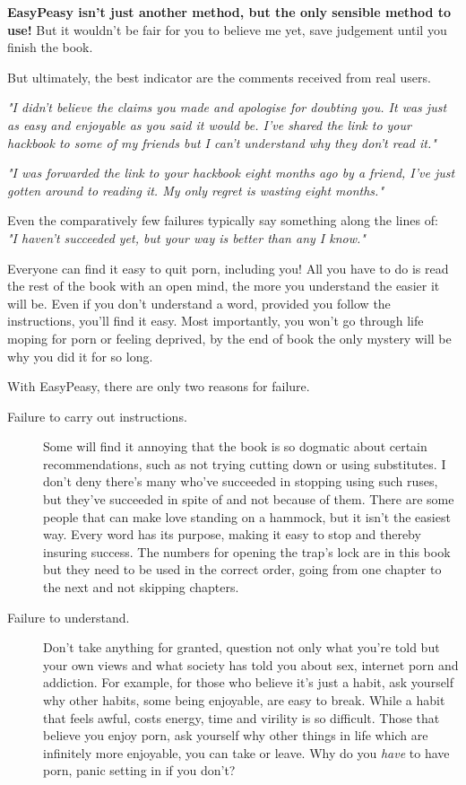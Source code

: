 \documentclass[easypeasy.tex]{subfiles}
\begin{document}
\textbf{EasyPeasy isn't just another method, but the only sensible method to use!} But it wouldn't be fair for you to believe me yet, save judgement until you finish the book.

But ultimately, the best indicator are the comments received from real users.

\textit{"I didn't believe the claims you made and apologise for doubting you. It was just as easy and enjoyable as you said it would be. I've shared the link to your hackbook to some of my friends but I can't understand why they don't read it."}

\textit{"I was forwarded the link to your hackbook eight months ago by a friend, I've just gotten around to reading it. My only regret is wasting eight months."}

Even the comparatively few failures typically say something along the lines of: \\ \textit{"I haven't succeeded yet, but your way is better than any I know."}

Everyone can find it easy to quit porn, including you! All you have to do is read the rest of the book with an open mind, the more you understand the easier it will be. Even if you don't understand a word, provided you follow the instructions, you'll find it easy. Most importantly, you won't go through life moping for porn or feeling deprived, by the end of book the only mystery will be why you did it for so long.

With EasyPeasy, there are only two reasons for failure.

\begin{description}
  \item [Failure to carry out instructions.] Some will find it annoying that the book is so dogmatic about certain recommendations, such as not trying cutting down or using substitutes. I don't deny there's many who've succeeded in stopping using such ruses, but they've succeeded in spite of and not because of them. There are some people that can make love standing on a hammock, but it isn't the easiest way. Every word has its purpose, making it easy to stop and thereby insuring success. The numbers for opening the trap's lock are in this book but they need to be used in the correct order, going from one chapter to the next and not skipping chapters.

  \item [Failure to understand.] Don't take anything for granted, question not only what you're told but your own views and what society has told you about sex, internet porn and addiction. For example, for those who believe it's just a habit, ask yourself why other habits, some being enjoyable, are easy to break. While a habit that feels awful, costs energy, time and virility is so difficult. Those that believe you enjoy porn, ask yourself why other things in life which are infinitely more enjoyable, you can take or leave. Why do you \textit{have} to have porn, panic setting in if you don't?
\end{description}
\end{document}

